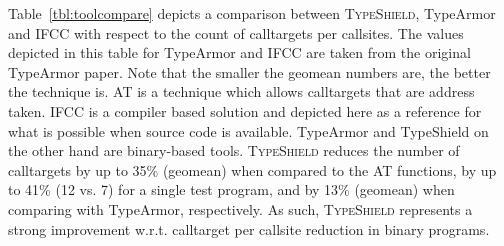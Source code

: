Table~\ref{tbl:toolcompare} depicts 
a comparison between \textsc{TypeShield}, TypeArmor and IFCC with respect to the count of calltargets per callsites. 
The values depicted in this table for TypeArmor and IFCC are taken from the original TypeArmor paper.
Note that the smaller the geomean numbers are, the better the technique is. AT is a technique which allows calltargets that are address taken. 
IFCC is a compiler based solution and depicted here as a reference for what is possible when 
source code is available. TypeArmor and TypeShield on the other hand are binary-based tools. 
\textsc{TypeShield} reduces the number of calltargets by up to 35\% (geomean) when 
compared to the AT functions, by up to 41\% (12 vs. 7) for a single test program, and by 13\% (geomean) 
when comparing with TypeArmor, respectively.
As such, \textsc{TypeShield} represents a strong improvement w.r.t. calltarget per callsite reduction in binary programs.



